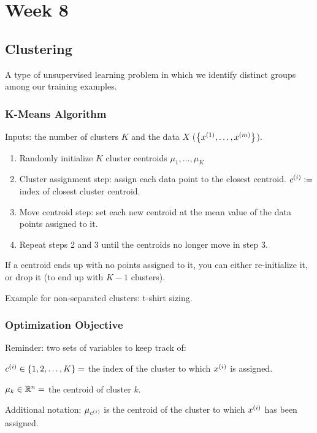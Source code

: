 \chapter{Week 8}

\section{Clustering}

A type of unsupervised learning problem in which we identify
distinct groups among our training examples.

\subsection{K-Means Algorithm}

Inputs: the number of clusters $K$ and the data $X$ ($\qty{x_{}^{(1)}, \dots, x_{}^{(m)}}$).

\begin{enumerate}
    \item Randomly initialize $K$ cluster centroids 
        $\mu_1, \dots, \mu_K$
    \item Cluster assignment step: assign each data point to the closest centroid.
        $c_{}^{(i)} :=$ index of closest cluster centroid.
    \item Move centroid step: set each new centroid at the mean value of the data points assigned to it.
    \item Repeat steps 2 and 3 until the centroids no longer move in step 3.
\end{enumerate}

If a centroid ends up with no points assigned to it, you can either re-initialize it,
or drop it (to end up with $K-1$ clusters).

Example for non-separated clusters: t-shirt sizing.

\subsection{Optimization Objective}

Reminder: two sets of variables to keep track of:

$c_{}^{(i)} \in \qty{1,2,\dots,K} = $ the index of the cluster to which $x_{}^{(i)}$ is assigned.

$\mu_k \in \mathbb{R}^n = $ the centroid of  cluster $k$.

Additional notation: $\mu_{c_{}^{(i)}}$ is the centroid of the cluster to which $x_{}^{(i)}$ has been assigned.

